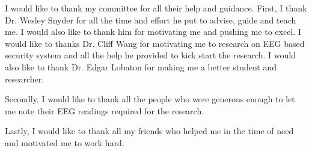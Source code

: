 \begin{acknowledgements}
I would like to thank my committee for all their help and guidance. First, I thank Dr. Wesley Snyder for all the time and effort he put to advise, guide and teach me. I would also like to thank him for motivating me and pushing me to excel. I would like to thanks Dr. Cliff Wang for motivating me to research on EEG based security system and all the help he provided to kick start the research. I would also like to thank Dr. Edgar Lobaton for making me a better student and researcher.

Secondly, I would like to thank all the people who were generous enough to let me note their EEG readings required for the research.

Lastly, I would like to thank all my friends who helped me in the time of need and motivated me to work hard.
\end{acknowledgements}


\thesistableofcontents

\thesislistoftables

\thesislistoffigures
